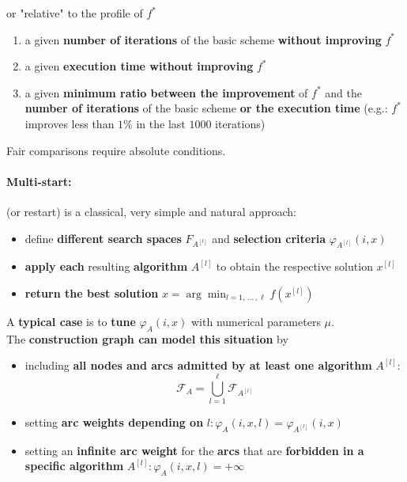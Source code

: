 or "relative" to the profile of $f^\ast$
\begin{enumerate}
	\item a given \textbf{number of iterations} of the basic scheme \textbf{without improving} $f^\ast$
	
	\item a given \textbf{execution time without improving} $f^\ast$
	
	\item a given \textbf{minimum ratio between the improvement} of $f^\ast$ and the \textbf{number of iterations} of the basic scheme \textbf{or the execution time} (e.g.: $f^\ast$ improves less than $1\%$ in the last $1000$ iterations)
\end{enumerate}

Fair comparisons require absolute conditions.

\newpage

\paragraph{Multi-start:} (or restart) is a classical, very simple and natural approach:
\begin{itemize}
	\item define \textbf{different search spaces} $F_{A^{[l]}}$ and \textbf{selection criteria} $\varphi_{A^{[l]}} (i, x)$
	
	\item \textbf{apply each} resulting \textbf{algorithm} $A^{[l]}$ to obtain the respective solution $x^{[l]}$
	
	\item \textbf{return the best solution} $x = \arg \min_{l = 1, \, ... \, , \ell} f(x^{[l]})$
\end{itemize}

A \textbf{typical case} is to \textbf{tune} $\varphi_A (i, x)$ with numerical parameters $\mu$.\\

The \textbf{construction graph can model this situation} by
\begin{itemize}
	\item including \textbf{all nodes and arcs admitted by at least one algorithm} $A^{[l]}$:
	$$ \mathcal{F}_A = \bigcup_{l=1}^\ell \mathcal{F}_{A^{[l]}} $$
	
	\item setting \textbf{arc weights depending on} $l: \varphi_A (i, x, l) = \varphi_{A^{[l]}} (i, x)$
	
	\item setting an \textbf{infinite arc weight} for the \textbf{arcs} that are \textbf{forbidden in a specific algorithm} $A^{[l]}:\varphi_A (i, x, l) = + \infty$
\end{itemize}

